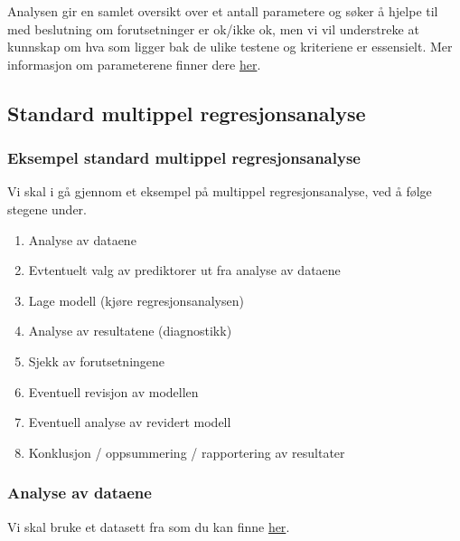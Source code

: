 \documentclass[
]{article}
\begin{document}
Analysen gir en samlet oversikt over et antall parametere og søker å hjelpe til med beslutning om forutsetninger er ok/ikke ok, men vi vil understreke at kunnskap om hva som ligger bak de ulike testene og kriteriene er essensielt. Mer informasjon om parameterene finner dere \href{https://ihrke.github.io/rnorsk/reference/regression.diagnostics.html}{her}.

\hypertarget{standard-multippel-regresjonsanalyse}{%
\subsection{Standard multippel regresjonsanalyse}\label{standard-multippel-regresjonsanalyse}}

\hypertarget{eksempel-standard-multippel-regresjonsanalyse}{%
\subsubsection{Eksempel standard multippel regresjonsanalyse}\label{eksempel-standard-multippel-regresjonsanalyse}}

Vi skal i gå gjennom et eksempel på multippel regresjonsanalyse, ved å følge stegene under.

\begin{enumerate}
\def\labelenumi{\arabic{enumi}.}
\item
  Analyse av dataene
\item
  Evtentuelt valg av prediktorer ut fra analyse av dataene
\item
  Lage modell (kjøre regresjonsanalysen)
\item
  Analyse av resultatene (diagnostikk)
\item
  Sjekk av forutsetningene
\item
  Eventuell revisjon av modellen
\item
  Eventuell analyse av revidert modell
\item
  Konklusjon / oppsummering / rapportering av resultater
\end{enumerate}

\hypertarget{analyse-av-dataene}{%
\subsubsection{Analyse av dataene}\label{analyse-av-dataene}}

Vi skal bruke et datasett fra \citet{pallantSPSSSurvivalManual2010} som du kan finne \href{https://www.mheducation.co.uk/data-files}{her}.
\end{document}
